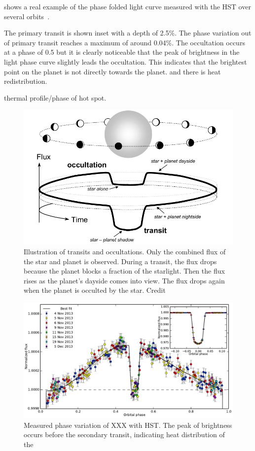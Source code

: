  shows a real example of the phase folded light curve measured with the HST over several orbits~\citep{stevenson_thermal_2014}.

The primary transit is shown inset with a depth of 2.5\%. The phase variation out of primary transit reaches a maximum of around 0.04\%. The occultation occurs at a phase of 0.5 but it is clearly noticeable that the peak of brightness in the light phase curve slightly leads the occultation. This indicates that the brightest point on the planet is not directly towards the planet. and there is heat redistribution.

thermal profile/phase of hot spot.


\begin{figure}
    \centering
    \includegraphics[width=0.6\linewidth]{./figures/introduction/circular_diagram.png}
    \caption{Illustration of transits and occultations.
        Only the combined flux of the star and planet is observed.
        During a transit, the flux drops because the planet blocks a fraction of the starlight.
        Then the flux rises as the planet’s dayside comes into view.
        The flux drops again when the planet is occulted by the star. Credit~\citet{winn_transits_2010}}
    \label{fig:transits_and_occultations}
\end{figure}


\begin{figure}
    \centering
    \includegraphics[width=0.6\linewidth]{figures/introduction/stevenson_phasecurve2014}
    \caption{Measured phase variation of XXX with HST. The peak of brightness occurs before the secondary transit, indicating heat distribution of the  \cite{stevenson_thermal_2014}}
    \label{fig:stevensonphasecurve2014}
\end{figure}



